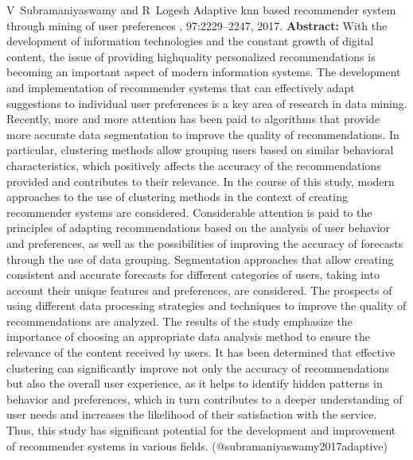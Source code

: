 \documentclass{article}
\begin{document}
\begin{thebibliography}{}
 V~Subramaniyaswamy and R~Logesh \newblock Adaptive knn based recommender system through mining of user preferences , 97:2229--2247, 2017. \newblock \textbf{Abstract:} With the development of information technologies and the constant growth of digital content, the issue of providing highquality personalized recommendations is becoming an important aspect of modern information systems. The development and implementation of recommender systems that can effectively adapt suggestions to individual user preferences is a key area of research in data mining. Recently, more and more attention has been paid to algorithms that provide more accurate data segmentation to improve the quality of recommendations. In particular, clustering methods allow grouping users based on similar behavioral characteristics, which positively affects the accuracy of the recommendations provided and contributes to their relevance. In the course of this study, modern approaches to the use of clustering methods in the context of creating recommender systems are considered. Considerable attention is paid to the principles of adapting recommendations based on the analysis of user behavior and preferences, as well as the possibilities of improving the accuracy of forecasts through the use of data grouping. Segmentation approaches that allow creating consistent and accurate forecasts for different categories of users, taking into account their unique features and preferences, are considered. The prospects of using different data processing strategies and techniques to improve the quality of recommendations are analyzed. The results of the study emphasize the importance of choosing an appropriate data analysis method to ensure the relevance of the content received by users. It has been determined that effective clustering can significantly improve not only the accuracy of recommendations but also the overall user experience, as it helps to identify hidden patterns in behavior and preferences, which in turn contributes to a deeper understanding of user needs and increases the likelihood of their satisfaction with the service. Thus, this study has significant potential for the development and improvement of recommender systems in various fields. \newblock (@subramaniyaswamy2017adaptive)


\end{thebibliography}
\end{document}
